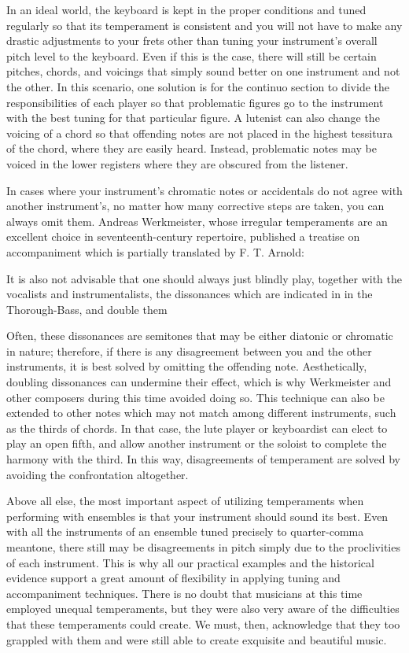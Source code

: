 In an ideal world, the keyboard is kept in the proper conditions and tuned regularly so that its
temperament is consistent and you will not have to make any drastic adjustments to your frets other
than tuning your instrument's overall pitch level to the keyboard. Even if this is the case, there
will still be certain pitches, chords, and voicings that simply sound better on one instrument and
not the other.  In this scenario, one solution is for the continuo section to divide the
responsibilities of each player so that problematic figures go to the instrument with the best
tuning for that particular figure.  A lutenist can also change the voicing of a chord so that
offending notes are not placed in the highest tessitura of the chord, where they are easily heard.
Instead, problematic notes may be voiced in the lower registers where they are obscured from the
listener.

In cases where your instrument's chromatic notes or accidentals do not agree with another
instrument's, no matter how many corrective steps are taken, you can always omit them. Andreas
Werkmeister, whose irregular temperaments are an excellent choice in seventeenth-century repertoire,
published a treatise on accompaniment which is partially translated by F. T. Arnold:
\begin{blocks}
It is also not advisable that one should always just blindly play, together with the vocalists
and instrumentalists, the dissonances which are indicated in in the Thorough-Bass, and double
them
\autocite[210]{FTA:1}
\end{blocks}
Often, these dissonances are semitones that may be either diatonic or chromatic in nature;
therefore, if there is any disagreement between you and the other instruments, it is best solved by
omitting the offending note.  Aesthetically, doubling dissonances can undermine their effect,
which is why Werkmeister and other composers during this time avoided doing so.  \autocite[45]{RJ:1}
This technique can also be extended to other notes which may not match among different instruments,
such as the thirds of chords.  In that case, the lute player or keyboardist can elect to play an
open fifth, and allow another instrument or the soloist to complete the harmony with the third.  In this
way, disagreements of temperament are solved by avoiding the confrontation altogether.

Above all else, the most important aspect of utilizing temperaments when performing with ensembles
is that your instrument should sound its best. Even with all the instruments of an ensemble tuned
precisely to quarter-comma meantone, there still may be disagreements in pitch simply due to the
proclivities of each instrument. This is why all our practical examples and the historical evidence
support a great amount of flexibility in applying tuning and accompaniment techniques. There is no
doubt that musicians at this time employed unequal temperaments, but they were also very aware of
the difficulties that these temperaments could create.  We must, then, acknowledge that they too
grappled with them and were still able to create exquisite and beautiful music.

